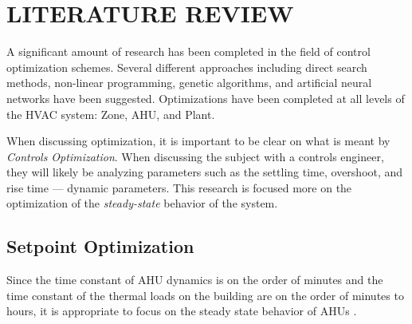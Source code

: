 %
%
%


\chapter{\uppercase {Literature Review}}


A significant amount of research has been completed in the field of control optimization schemes. Several different approaches including direct search methods, non-linear programming, genetic algorithms, and artificial neural networks have been suggested. Optimizations have been completed at all levels of the HVAC system: Zone, AHU, and Plant.  

When discussing optimization, it is important to be clear on what is meant by \textit{Controls Optimization}. When discussing the subject with a controls engineer, they will likely be analyzing parameters such as the settling time, overshoot, and rise time --- dynamic parameters. This research is focused more on the optimization of the \textit{steady-state} behavior of the system. 





\section{Setpoint Optimization}

Since the time constant of AHU dynamics is on the order of minutes and the time constant of the thermal loads on the building are on the order of minutes to hours, it is appropriate to focus on the steady state behavior of AHUs \cite{Bourdouxhe1998ReferenceEquipment}.

